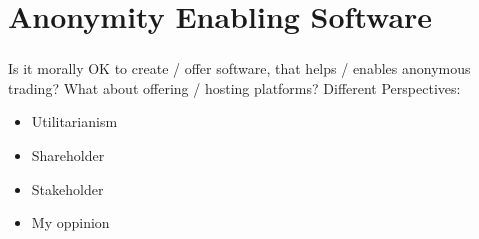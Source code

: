 \section{Anonymity Enabling Software}

\begin{frame}
    \frametitle{\insertsection}
    Is it morally OK to create / offer software, that helps / enables anonymous trading? What about offering / hosting platforms? Different Perspectives:

    \begin{itemize}
        \item Utilitarianism
        \item Shareholder
        \item Stakeholder
        \item My oppinion
    \end{itemize}
\end{frame}